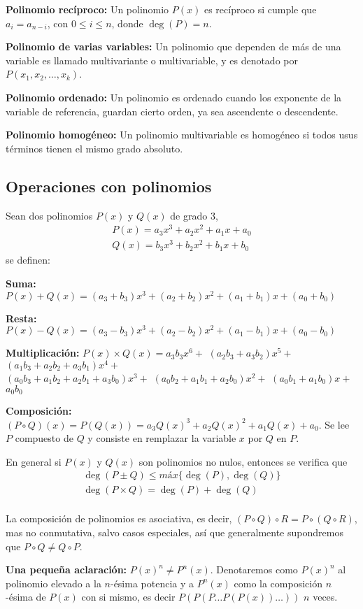 \textbf{Polinomio recíproco:} Un polinomio $P(x)$ es recíproco si cumple que $a_i = a_{n-i}$, con $0\leq i\leq n$, donde $\deg{(P)} = n$.

\textbf{Polinomio de varias variables:} Un polinomio que dependen de más de una variable es llamado multivariante o multivariable, y es denotado por $P(x_1, x_2, \dots, x_k)$.

\textbf{Polinomio ordenado:} Un polinomio es ordenado cuando los exponente de la variable de referencia, guardan cierto orden, ya sea ascendente o descendente.

\textbf{Polinomio homogéneo:} Un polinomio multivariable es homogéneo si todos usus términos tienen el mismo grado absoluto.


\subsection{Operaciones con polinomios}

Sean dos polinomios $P(x)$ y $Q(x)$ de grado 3,
\begin{gather*}
    P(x) = a_3 x^3 + a_2 x^2 + a_1 x + a_0\\
    Q(x) = b_3 x^3 + b_2 x^2 + b_1 x + b_0
\end{gather*}
se definen:

\textbf{Suma:} $P(x) + Q(x) = (a_3+b_3)x^3+(a_2+b_2)x^2+(a_1+b_1)x+(a_0+b_0)$

\textbf{Resta:} $P(x) - Q(x) = (a_3-b_3)x^3+(a_2-b_2)x^2+(a_1-b_1)x+(a_0-b_0)$

\textbf{Multiplicación:} $P(x)\times Q(x) = a_3 b_3 x^6 + $
$(a_2 b_3 + a_3 b_2)x^5 + $
$(a_1 b_3 + a_2 b_2 + a_3 b_1)x^4 + $\\
$(a_0 b_3 + a_1 b_2 + a_2 b_1 + a_3 b_0)x^3 + $
$(a_0 b_2 + a_1 b_1 + a_2 b_0)x^2 + $
$(a_0 b_1 + a_1 b_0)x + $
$a_0 b_0$

\textbf{Composición:} $(P \circ Q)(x) = P(Q(x)) = a_3 Q(x)^3 + a_2 Q(x)^2 + a_1 Q(x) + a_0$. Se lee $P$ compuesto de $Q$ y consiste en remplazar la variable $x$ por $Q$ en $P$.

En general si $P(x)$ y $Q(x)$ son polinomios no nulos, entonces se verifica que
\begin{gather*}
    \deg{(P\pm Q)} \leq máx\{\deg{(P)}, \deg{(Q)}\}\\
    \deg{(P\times Q)} = \deg{(P)} + \deg{(Q)}\\
\end{gather*}

La composición de polinomios es asociativa, es decir, $(P \circ Q) \circ R = P \circ (Q \circ R)$, mas no conmutativa, salvo casos especiales, así que generalmente supondremos que $P \circ Q \neq  Q \circ P$.

\textbf{Una pequeña aclaración:} $P(x)^n \neq P^n(x)$. Denotaremos como $P(x)^n$ al polinomio elevado a la $n$-ésima potencia y a $P^n(x)$ como la composición $n$-ésima de $P(x)$ con si mismo, es decir $P(P(P\dots P(P(x))\dots))$ $n$ veces.